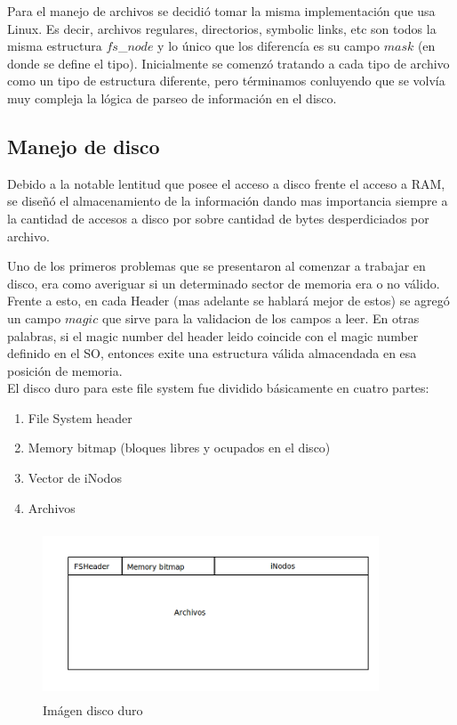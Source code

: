 \documentclass[english]{article}
\begin{document}
Para el manejo de archivos se decidió tomar la misma implementación
que usa Linux. Es decir, archivos regulares, directorios, symbolic
links, etc son todos la misma estructura $fs$\_$node$ y lo único
que los diferencía es su campo $mask$ (en donde se define el tipo).
Inicialmente se comenzó tratando a cada tipo de archivo como un tipo
de estructura diferente, pero términamos conluyendo que se volvía
muy compleja la lógica de parseo de información en el disco.


\subsection{Manejo de disco}

Debido a la notable lentitud que posee el acceso a disco frente el
acceso a RAM, se diseñó el almacenamiento de la información dando
mas importancia siempre a la cantidad de accesos a disco por sobre
cantidad de bytes desperdiciados por archivo.

Uno de los primeros problemas que se presentaron al comenzar a trabajar
en disco, era como averiguar si un determinado sector de memoria era
o no válido. Frente a esto, en cada Header (mas adelante se hablará
mejor de estos) se agregó un campo $magic$ que sirve para la validacion
de los campos a leer. En otras palabras, si el magic number del header
leido coincide con el magic number definido en el SO, entonces exite
una estructura válida almacendada en esa posición de memoria. \\


El disco duro para este file system fue dividido básicamente en cuatro
partes:
\begin{enumerate}
\item File System header
\item Memory bitmap (bloques libres y ocupados en el disco)
\item Vector de iNodos
\item Archivos
\end{enumerate}

\begin{figure}[H]
\begin{center}
\includegraphics[width=10cm,height=5cm,keepaspectratio]{Imagen_disco}

\caption{Imágen disco duro}
\end{center}
\end{figure}
\end{document}
